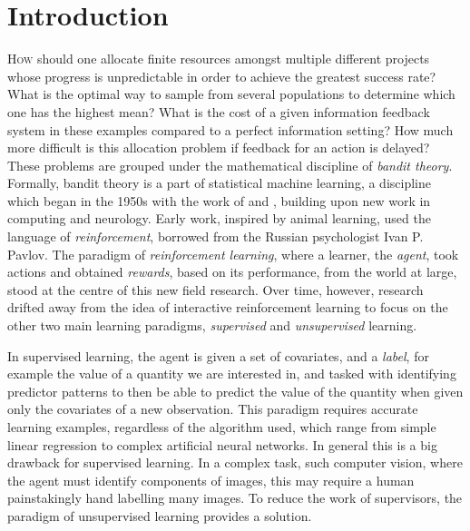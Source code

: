 \chapter*{Introduction}

\lettrine[lines=4]{\textcolor{dropcap}{H}}{ow} should one allocate finite resources amongst multiple different projects whose progress is unpredictable in order to achieve the greatest success rate? What is the optimal way to sample from several populations to determine which one has the highest mean? What is the cost of a given information feedback system in these examples compared to a perfect information setting? How much more difficult is this allocation problem if feedback for an action is delayed? These problems are grouped under the mathematical discipline of {\em bandit theory}. %
Formally, bandit theory is a part of statistical machine learning, a discipline which began in the 1950s with the work of \citeauthor{rosenblatt:1958} and \citeauthor{samuel:1959}, building upon new work in computing and neurology. Early work, inspired by animal learning, used the language of {\em reinforcement}, borrowed from the Russian psychologist Ivan P. Pavlov. The paradigm of {\em reinforcement learning}, where a learner, the {\em agent}, took actions and obtained {\em rewards}, based on its performance, from the world at large, stood at the centre of this new field research. Over time, however, research drifted away from the idea of interactive reinforcement learning to focus on the other two main learning paradigms, {\em supervised} and {\em unsupervised} learning. 

\par In supervised learning, the agent is given a set of covariates, and a {\em label}, for example the value of a quantity we are interested in, and tasked with identifying predictor patterns to then be able to predict the value of the quantity when given only the covariates of a new observation. This paradigm requires accurate learning examples, regardless of the algorithm used, which range from simple linear regression to complex artificial neural networks. In general this is a big drawback for supervised learning. In a complex task, such computer vision, where the agent must identify components of images, this may require a human painstakingly hand labelling many images. To reduce the work of supervisors, the paradigm of unsupervised learning provides a solution.

